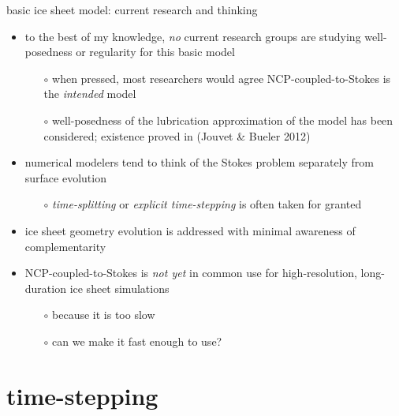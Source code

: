 \documentclass[svgnames,
               hyperref={colorlinks,citecolor=DeepPink4,linkcolor=FireBrick,urlcolor=Maroon},
               usepdftitle=false]  %
               {beamer}
\begin{document}
\begin{frame}{basic ice sheet model: current research and thinking}

\begin{itemize}
\item to the best of my knowledge, \emph{no} current research groups are studying well-posedness or regularity for this basic model
    \begin{itemize}
    \item[$\circ$] when pressed, most researchers would agree NCP-coupled-to-Stokes is the \emph{intended} model
    \item[$\circ$] well-posedness of the lubrication approximation of the model has been considered; existence proved in (Jouvet \& Bueler 2012)
    \end{itemize}

\medskip
\item numerical modelers tend to think of the Stokes problem separately from surface evolution
    \begin{itemize}
    \item[$\circ$] \emph{time-splitting} or \emph{explicit time-stepping} is often taken for granted
    \end{itemize}

\medskip
\item ice sheet geometry evolution is addressed with minimal awareness of complementarity

\medskip
\item NCP-coupled-to-Stokes is \emph{not yet} in common use for high-resolution, long-duration ice sheet simulations
    \begin{itemize}
    \item[$\circ$] because it is too slow
    \item[$\circ$] \alert{can we make it fast enough to use?}
    \end{itemize}
\end{itemize}
\end{frame}



\section{time-stepping}
\end{document}
